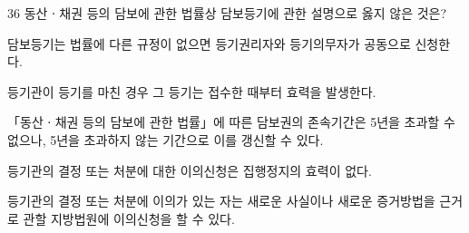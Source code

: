 \begin{question}{36}
동산ㆍ채권 등의 담보에 관한 법률상 담보등기에 관한 설명으로 옳지 않은 것은?
\begin{choices}
  \item 담보등기는 법률에 다른 규정이 없으면 등기권리자와 등기의무자가 공동으로 신청한다.
  \item 등기관이 등기를 마친 경우 그 등기는 접수한 때부터 효력을 발생한다.
  \item 「동산ㆍ채권 등의 담보에 관한 법률」에 따른 담보권의 존속기간은 5년을 초과할 수 없으나, 5년을 초과하지 않는 기간으로 이를 갱신할 수 있다.
  \item 등기관의 결정 또는 처분에 대한 이의신청은 집행정지의 효력이 없다.
  \item 등기관의 결정 또는 처분에 이의가 있는 자는 새로운 사실이나 새로운 증거방법을 근거로 관할 지방법원에 이의신청을 할 수 있다.
\end{choices}
\end{question}
